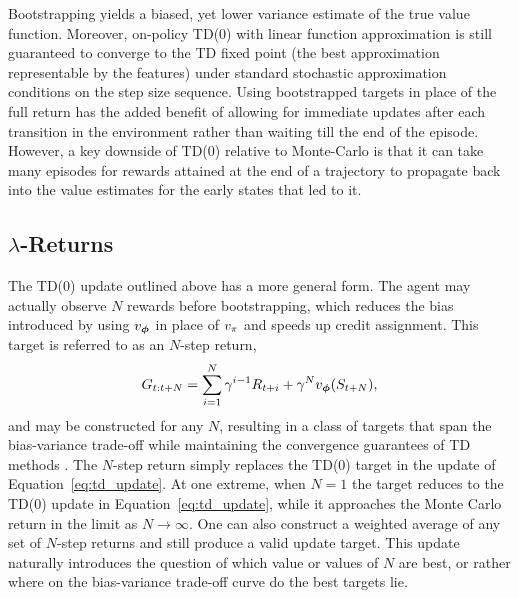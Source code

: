 Bootstrapping yields a biased, yet lower variance estimate of the true value function. Moreover, on-policy TD(0) with linear function approximation is still guaranteed to converge to the TD fixed point (the best approximation representable by the features) under standard stochastic approximation conditions on the step size sequence. Using bootstrapped targets in place of the full return has the added benefit of allowing for immediate updates after each transition in the environment rather than waiting till the end of the episode. However, a key downside of TD(0) relative to Monte-Carlo is that it can take many episodes for rewards attained at the end of a trajectory to propagate back into the value estimates for the early states that led to it.
\FloatBarrier
\subsection{$\lambda$-Returns}
The TD(0) update outlined above has a more general form. The agent may actually observe $N$ rewards before bootstrapping, which reduces the bias introduced by using $v_{\bm \phi}$ in place of $v_{\pi}$ and speeds up credit assignment. This target is referred to as an $N$-step return,
\begin{equation}
    G_{t:t+N} = \sum_{i=1}^{N} \gamma^{i-1} R_{t+i} + \gamma^{N} v_{\bm \phi}(S_{t+N}),
    \label{eq:nstep_return}
\end{equation}
and may be constructed for any $N$, resulting in a class of targets that span the bias-variance trade-off while maintaining the convergence guarantees of TD methods . The $N$-step return simply replaces the TD(0) target in the update of Equation~\eqref{eq:td_update}.
At one extreme, when $N = 1$ the target reduces to the TD(0) update in Equation~\eqref{eq:td_update}, while it approaches the Monte Carlo return in the limit as $N \to \infty$. One can also construct a weighted average of any set of $N$-step returns and still produce a valid update target. This update naturally introduces the question of which value or values of $N$ are best, or rather where on the bias-variance trade-off curve do the best targets lie.

